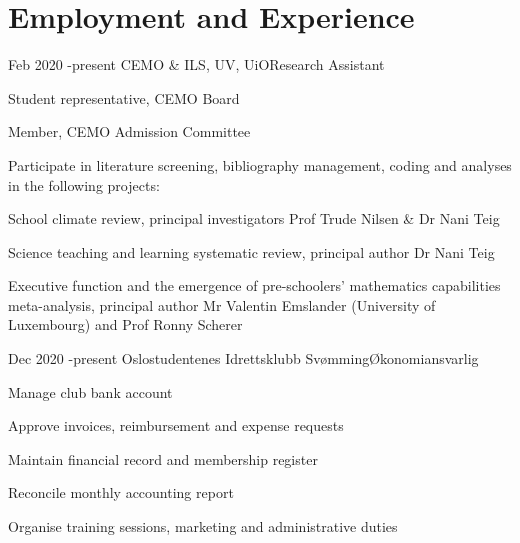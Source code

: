 \documentclass[10pt]{article} %
\begin{document}





\section{Employment and Experience}

\job
{Feb 2020 -}{present}
{CEMO \& ILS, UV, UiO}{}{Research Assistant}{
  \begin{itemize-noindent}\setlength\itemsep{0pt}
  \item Student representative, CEMO Board
  \item Member, CEMO Admission Committee
  \item Participate in literature screening, bibliography management, coding and analyses in the following projects:
    \begin{itemize-noindent}\setlength\itemsep{0pt}
    \item{School climate review, principal investigators Prof Trude Nilsen \& Dr Nani Teig}
    \item{Science teaching and learning systematic review, principal author Dr Nani Teig}
    \item{Executive function and the emergence of pre-schoolers' mathematics capabilities meta-analysis, principal author Mr Valentin Emslander (University of Luxembourg) and Prof Ronny Scherer}
    \end{itemize-noindent}
\end{itemize-noindent}
}

\job
{Dec 2020 -}{present}
{Oslostudentenes Idrettsklubb Sv{\o}mming}{}{{\O}konomiansvarlig}{
\begin{itemize-noindent}\setlength\itemsep{0pt}
  \item{Manage club bank account}
  \item{Approve invoices, reimbursement and expense requests}
  \item{Maintain financial record and membership register}
  \item{Reconcile monthly accounting report}
  \item{Organise training sessions, marketing and administrative duties}
\end{itemize-noindent}
}
\end{document}
